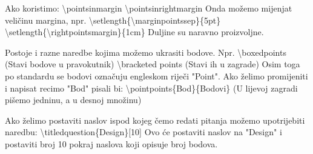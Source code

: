 \documentclass[addpoints,answers]{beamer}
\newcounter{points}
\begin{document}
\begin{frame}
	Ako koristimo:
	\newline
	\newline
	\color{blue}
	\textbackslash{pointsinmargin}
	\newline
	\newline
	\textbackslash{pointsinrightmargin}
	\newline
	\newline
	\color{black}
	Onda možemo mijenjat veličinu margina, npr.
	\newline
	\newline
	\color{blue}
	\textbackslash{setlength\{\textbackslash{marginpointssep}\}}\{5pt\}
	\newline
	\newline
	\textbackslash{setlength\{\textbackslash{rightpointsmargin}\}}\{1cm\}
	\color{black}
	\newline
	\newline
	Duljine su naravno proizvoljne.
\end{frame}


\begin{frame}
	Postoje i razne naredbe kojima možemo ukrasiti bodove. Npr.
	\newline
	\newline
	\color{blue}
	\textbackslash{boxedpoints}
	\color{black}
	(Stavi bodove u pravokutnik)
	\color{blue}
	\newline
	\newline
	\color{blue}
	\textbackslash{bracketed points}
	\color{black}
	(Stavi ih u zagrade)
	\newline
	\newline
	Osim toga po standardu se bodovi označuju engleskom riječi "Point". Ako želimo promijeniti i napisat recimo "Bod" pisali bi:
	\newline
	\newline
	\color{blue}
	\textbackslash{pointpoints\{Bod\}\{Bodovi\}}
	\color{black}
	\newline
	(U lijevoj zagradi pišemo jedninu, a u desnoj množinu)
	\color{blue}
\end{frame}

\begin{frame}
	Ako želimo postaviti naslov ispod kojeg čemo redati pitanja možemo upotrijebiti naredbu:
	\newline
	\newline
	\color{blue}
	\textbackslash{titledquestion\{Design\}[10]}
	\color{black}
	\newline
	\newline
	Ovo će postaviti naslov na "Design" i postaviti broj 10 pokraj naslova koji opisuje broj bodova.
\end{frame}



%
%
%

\begin{frame}

\end{frame}

%
%	
%
%

\begin{frame}

\end{frame}
\end{document}
